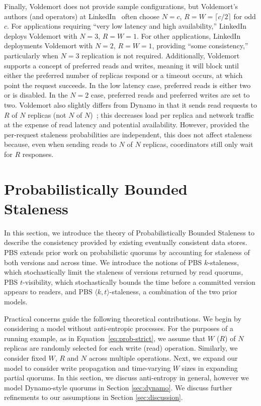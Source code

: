\documentclass{vldb}
\newcommand{\sectionskip}{-0em}
\begin{document}
 Finally, Voldemort does not provide sample configurations, but
 Voldemort's authors (and operators) at LinkedIn~\cite{feinbergpc}
 often choose $N$$=$$c$, $R$$=$$W$$=$$ \lceil c/2 \rceil$ for odd $c$.
 For applications requiring ``very low latency and high
 availability,'' LinkedIn deploys Voldemort with $N$$=$$3$,
 $R$$=$$W$$=$$1$.  For other applications, LinkedIn deployments
 Voldemort with $N$$=$$2$, $R$$=$$W$$=$$1$, providing ``some
 consistency,'' particularly when $N$$=$$3$ replication is not
 required.  Additionally, Voldemort supports a concept of preferred
 reads and writes, meaning it will block until either the preferred
 number of replicas respond or a timeout occurs, at which point the
 request succeeds.  In the low latency case, preferred reads is either
 two or is disabled.  In the $N$$=$$2$ case, preferred reads and
 preferred writes are set to two.  Voldemort also slightly differs
 from Dynamo in that it sends read requests to $R$ of $N$ replicas
 (not $N$ of $N$)~\cite{voldemortpub}; this decreases load per replica
 and network traffic at the expense of read latency and potential
 availability.  However, provided the per-request staleness
 probabilities are independent, this does not affect staleness
 because, even when sending reads to $N$ of $N$ replicas, coordinators
 still only wait for $R$ responses.


\vspace{\sectionskip}\section{Probabilistically Bounded\\Staleness}
\label{sec:pbs}

In this section, we introduce the theory of Probabilistically Bounded
Staleness to describe the consistency provided by existing eventually
consistent data stores.  PBS extends prior work on
probabilistic quorums by accounting for staleness of both versions and
across time.  We introduce the notions of PBS $k$-staleness, which
stochastically limit the staleness of versions returned by read
quorums, PBS $t$-visibility, which stochastically bounds the time
before a committed version appears to readers, and PBS $\langle k,
t \rangle$-staleness, a combination of the two prior models.


Practical concerns guide the following theoretical contributions.  We
begin by considering a model without anti-entropic processes.  For the
purposes of a running example, as in Equation~\ref{eq:prob-strict}, we
assume that $W$ ($R$) of $N$ replicas are randomly selected for each
write (read) operation.  Similarly, we consider fixed $W$, $R$ and $N$
across multiple operations. Next, we expand our model to consider
write propagation and time-varying $W$ sizes in expanding partial
quorums.  In this section, we discuss anti-entropy in general, however
we model Dynamo-style quorums in Section \ref{sec:dynamo}. We discuss
further refinements to our assumptions in Section
\ref{sec:discussion}.
\end{document}
